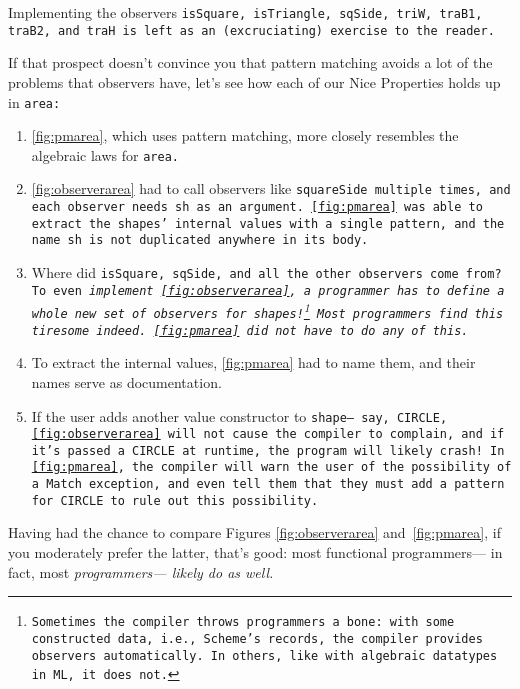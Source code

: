 \documentclass[manuscript,screen,review, 12pt, nonacm]{acmart}
\begin{document}
    Implementing the observers \tt{isSquare}, \tt{isTriangle}, \tt{sqSide},
    \tt{triW}, \tt{traB1}, \tt{traB2}, and \tt{traH} is left as an
    (excruciating) exercise to the reader. 
    
    If that prospect doesn't convince you that pattern matching avoids a lot of
    the problems that observers have, let's see how each of our Nice Properties
    holds up in \tt{area}: 
    
    \begin{enumerate}
        \item[\bf{(1)}] \ref{fig:pmarea}, which uses pattern matching, more
        closely resembles the algebraic laws for \tt{area}. 
        \item[\bf{(2)}] \ref{fig:observerarea} had to call observers like
        \tt{squareSide} multiple times, and each observer needs \tt{sh} as an
        argument. \ref{fig:pmarea} was able to extract the \tt{shape}s' internal
        values with a single pattern, and the name \tt{sh} is not duplicated
        anywhere in its body. 
        \item[\bf{(3)}] Where did \tt{isSquare}, \tt{sqSide}, and all the other
        observers come from? To even \it{implement} \ref{fig:observerarea}, a
        programmer has to define a whole new set of observers for
        \tt{shape}s!\footnote{Sometimes the compiler throws programmers a bone:
        with some constructed data, i.e., Scheme's records, the compiler
        provides observers automatically. In others, like with algebraic
        datatypes in ML, it does not.} Most programmers find this tiresome
        indeed. \ref{fig:pmarea} did not have to do any of this.
        \item[\bf{(4)}] To extract the internal values, \ref{fig:pmarea} had to
        name them, and their names serve as documentation. 
        \item[\bf{(5)}] If the user adds another value constructor to
        \tt{shape}--- say, \tt{CIRCLE}, \ref{fig:observerarea} will not cause
        the compiler to complain, and if it's passed a \tt{CIRCLE} at runtime,
        the program will likely crash! In \ref{fig:pmarea}, the compiler will
        warn the user of the possibility of a \tt{Match} exception, and even
        tell them that they must add a pattern for \tt{CIRCLE} to rule out this
        possibility. 
    \end{enumerate}

    Having had the chance to compare Figures \ref{fig:observerarea}
    and~\ref{fig:pmarea}, if you moderately prefer the latter, that's good: most
    functional programmers--- in fact, most \it{programmers}--- likely do as
    well. 
\end{document}
